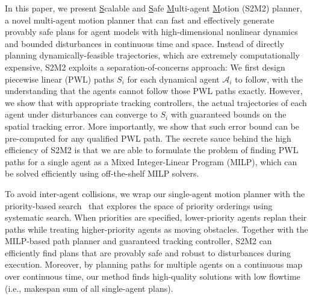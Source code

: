 \documentclass[letterpaper]{article} %
\theoremstyle{definition}
\begin{document}
In this paper, we present \underline{S}calable and \underline{S}afe \underline{M}ulti-agent \underline{M}otion (S2M2) planner, a novel multi-agent motion planner that can fast and effectively generate provably safe plans for agent models with high-dimensional nonlinear dynamics and bounded disturbances in continuous time and space. Instead of directly planning dynamically-feasible trajectories, which are extremely computationally expensive, S2M2 exploits a separation-of-concerns approach: We first design piecewise linear (PWL) paths $S_i$ for each dynamical agent $\mathcal{A}_i$ to follow, with the understanding that the agents cannot follow those PWL paths exactly. However, we show that with appropriate tracking controllers, the actual trajectories of each agent under disturbances can converge to $S_i$ with guaranteed bounds on the spatial tracking error. More importantly, we show that such error bound can be pre-computed for any qualified PWL path. The secrete sauce behind the high efficiency of S2M2 is that we are able to formulate the problem of finding PWL paths for a single agent as a Mixed Integer-Linear Program (MILP), which can be solved efficiently using off-the-shelf MILP solvers.

To avoid inter-agent collisions, we wrap our single-agent motion planner with the priority-based search~\cite{ma2019searching} that explores the space of priority orderings using systematic search. When priorities are specified, lower-priority agents replan their paths while treating higher-priority agents as moving obstacles. Together with the MILP-based path planner and guaranteed tracking controller, S2M2 can efficiently find plans that are provably safe and robust to disturbances during execution. Moreover, by planning paths for multiple agents on a continuous map over continuous time, our method finds high-quality solutions with low flowtime (i.e., makespan sum of all single-agent plans).

\end{document}
